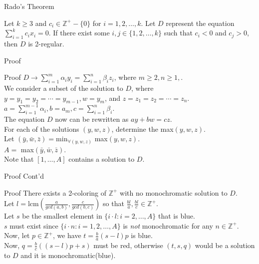 \documentclass{beamer}
\newcommand{\Z}{\mathbb Z} %
\begin{document}
\begin{frame}{Rado's Theorem}
    \begin{Theorem}
            Let $k \geq 3$ and $c_i \in \Z^+-\{0\}$ for $i = 1,2,\dots, k$. Let $D$ represent the equation $\sum^k_{i=1}c_ix_i=0$. If there exist some $i,j \in \{1,2,\dots,k\}$ such that $c_i < 0$ and $c_j > 0$, then $D$ is 2-regular. 
    \end{Theorem}
\end{frame}

\begin{frame}[t]{Proof}
    \begin{block}{Proof}
     $D \to \sum^m_{i=1}\alpha_iy_i = \sum^n_{i=1}\beta_iz_i$, where $m \geq 2, n \geq 1,$. \\
    \pause
    We consider a subset of the solution to $D$, where $y=y_1=y_2=\cdots=y_{m-1}, w=y_m$, and $z=z_1=z_2=\cdots=z_n$. \\
    $a=\sum^{m-1}_{i=1}\alpha_i, b=a_m, c=\sum^{n}_{i=1}\beta_i$. \\
    \pause
    The equation $D$ now can be rewritten as $ay+bw=cz$.\\
    \pause
    For each of the solutions $(y,w,z)$, determine the max$(y,w,z)$.\\
    \pause
    Let $(\bar{y}, \bar{w}, \bar{z})=$min$_{\forall (y,w,z)}$ max$(y,w,z)$. \\
    \pause
    $A=$ max$(\bar{y}, \bar{w}, \bar{z})$. \\
    Note that $[1,\dots, A]$ contains a solution to $D$.
    
    \end{block}
\end{frame}

\begin{frame}[t]{Proof Cont'd}
    \begin{block}{Proof}
        There exists a 2-coloring of $\Z^+$ with no monochromatic solution to $D$. \\
        \pause
        Let $l = $lcm$(\frac{a}{gcd(a,b)}, \frac{c}{gcd(b,c)})$ so that $\frac{bl}{a}, \frac{bl}{c} \in \Z^+$. \\
        \pause
        Let $s$ be the smallest element in $\{i\cdot l:i=2,\dots, A\}$ that is blue. \\
        $s$ must exist since $\{i\cdot n:i=1,2,\dots,A\}$ is \textit{not} monochromatic for any $n\in \Z^+$. \\
        \pause
        Now, let $p\in \Z^+$, we have $t=\frac{b}{a}(s-l)p$ is blue. \\
        \pause
        Now, $q=\frac{b}{c}((s-l)p+s)$ must be red, otherwise $(t,s,q)$ would be a solution to $D$ and it is monochromatic(blue).
    \end{block}
\end{frame}
\end{document}
